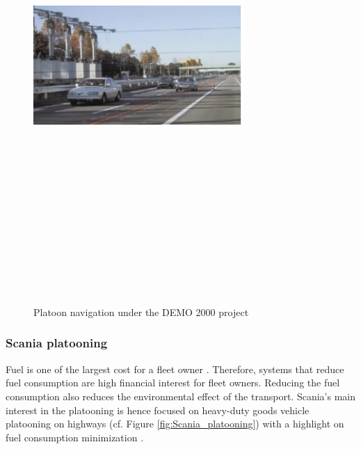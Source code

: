 \begin{figure}[!h]
        \centering 
        \includegraphics[width=8cm,height=18cm,keepaspectratio]{chapters/Chapitre_2/Figures/DEMO2000.PNG}
        \caption{Platoon navigation under the DEMO 2000 project \cite{fujioka2002its}}
        \label{fig:Demo_2000}
        \end{figure}


\subsubsection{Scania platooning}
Fuel is one of the largest cost for a fleet owner \cite{bergenhem2012overview} \cite{aarts2016european}. Therefore, systems that reduce fuel consumption are high financial interest for fleet owners. Reducing the fuel consumption also reduces the environmental effect of the transport. Scania's main interest in the platooning is hence focused on heavy-duty  goods vehicle platooning on highways (cf. Figure \ref{fig:Scania_platooning}) with a highlight on fuel consumption minimization \cite{alam2015heavy}. 


